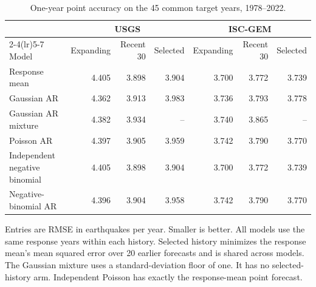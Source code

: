 \begin{table}[!htb]
\centering
\small
\caption{One-year point accuracy on the 45 common target years, 1978--2022.}
\label{tab:point}
\setlength{\tabcolsep}{4pt}
\begin{tabular}{lrrrrrr}
\toprule
 & \multicolumn{3}{c}{USGS} & \multicolumn{3}{c}{ISC-GEM} \\
\cmidrule(lr){2-4}\cmidrule(lr){5-7}
Model & Expanding & Recent 30 & Selected & Expanding & Recent 30 & Selected \\
\midrule
Response mean & 4.405 & 3.898 & 3.904 & 3.700 & 3.772 & 3.739 \\
Gaussian AR & 4.362 & 3.913 & 3.983 & 3.736 & 3.793 & 3.778 \\
Gaussian AR mixture & 4.382 & 3.934 & -- & 3.740 & 3.865 & -- \\
Poisson AR & 4.397 & 3.905 & 3.959 & 3.742 & 3.790 & 3.770 \\
Independent negative binomial & 4.405 & 3.898 & 3.904 & 3.700 & 3.772 & 3.739 \\
Negative-binomial AR & 4.396 & 3.904 & 3.958 & 3.742 & 3.790 & 3.770 \\
\bottomrule
\end{tabular}
\par\smallskip
\begin{minipage}{\linewidth}\footnotesize
Entries are RMSE in earthquakes per year. Smaller is better. All models use the same response years within each history. Selected history minimizes the response mean's mean squared error over 20 earlier forecasts and is shared across models. The Gaussian mixture uses a standard-deviation floor of one. It has no selected-history arm. Independent Poisson has exactly the response-mean point forecast.
\end{minipage}
\end{table}
